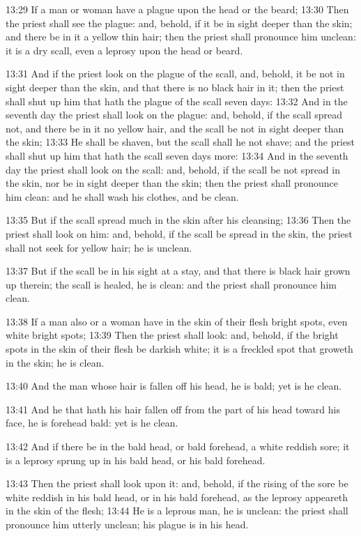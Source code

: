 13:29 If a man or woman have a plague upon the head or the beard; 13:30 Then the priest shall see the plague: and, behold, if it be in sight deeper than the skin; and there be in it a yellow thin hair; then the priest shall pronounce him unclean: it is a dry scall, even a leprosy upon the head or beard.

13:31 And if the priest look on the plague of the scall, and, behold, it be not in sight deeper than the skin, and that there is no black hair in it; then the priest shall shut up him that hath the plague of the scall seven days: 13:32 And in the seventh day the priest shall look on the plague: and, behold, if the scall spread not, and there be in it no yellow hair, and the scall be not in sight deeper than the skin; 13:33 He shall be shaven, but the scall shall he not shave; and the priest shall shut up him that hath the scall seven days more: 13:34 And in the seventh day the priest shall look on the scall: and, behold, if the scall be not spread in the skin, nor be in sight deeper than the skin; then the priest shall pronounce him clean: and he shall wash his clothes, and be clean.

13:35 But if the scall spread much in the skin after his cleansing; 13:36 Then the priest shall look on him: and, behold, if the scall be spread in the skin, the priest shall not seek for yellow hair; he is unclean.

13:37 But if the scall be in his sight at a stay, and that there is black hair grown up therein; the scall is healed, he is clean: and the priest shall pronounce him clean.

13:38 If a man also or a woman have in the skin of their flesh bright spots, even white bright spots; 13:39 Then the priest shall look: and, behold, if the bright spots in the skin of their flesh be darkish white; it is a freckled spot that groweth in the skin; he is clean.

13:40 And the man whose hair is fallen off his head, he is bald; yet is he clean.

13:41 And he that hath his hair fallen off from the part of his head toward his face, he is forehead bald: yet is he clean.

13:42 And if there be in the bald head, or bald forehead, a white reddish sore; it is a leprosy sprung up in his bald head, or his bald forehead.

13:43 Then the priest shall look upon it: and, behold, if the rising of the sore be white reddish in his bald head, or in his bald forehead, as the leprosy appeareth in the skin of the flesh; 13:44 He is a leprous man, he is unclean: the priest shall pronounce him utterly unclean; his plague is in his head.

